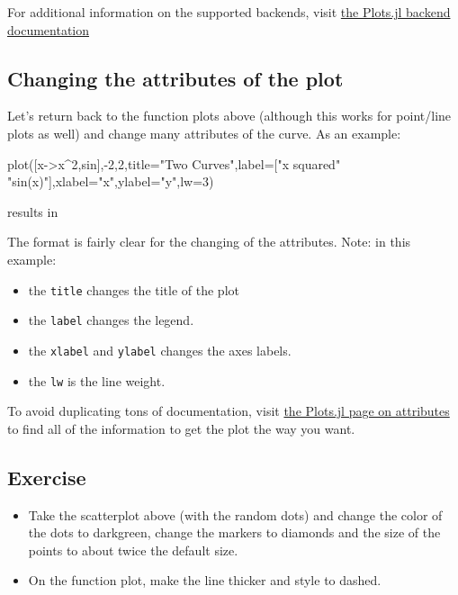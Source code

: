 For additional information on the supported backends, visit
\href{http://docs.juliaplots.org/latest/backends/}{the Plots.jl backend
documentation}


\subsection{Changing the attributes of the plot}

Let's return back to the function plots above (although this works for
point/line plots as well) and change many attributes of the curve. As an
example:

\begin{jlblock}[plots]
plot([x->x^2,sin],-2,2,title="Two Curves",label=["x squared" "sin(x)"],xlabel="x",ylabel="y",lw=3)
\end{jlblock}

results in
%
\begin{center}
\pgfplotsset{scale=0.7}
\end{center}
The format is fairly clear for the changing of the attributes. Note: in
this example:

\begin{itemize}
\item  the \texttt{title} changes the title of the plot
\item  the \texttt{label} changes the legend.
\item  the \texttt{xlabel} and \texttt{ylabel} changes the axes labels.
\item  the \texttt{lw} is the line weight.
\end{itemize}

To avoid duplicating tons of documentation, visit
\href{http://docs.juliaplots.org/latest/attributes/}{the Plots.jl page
on attributes} to find all of the information to get the plot the way
you want. 

\subsection{Exercise}

\begin{itemize}

\item  Take the scatterplot above (with the random dots) and change the color
  of the dots to darkgreen, change the markers to diamonds and the size of the points 
  to about twice the default size.
\item On the function plot, make the line thicker and style to dashed. 
\end{itemize}


